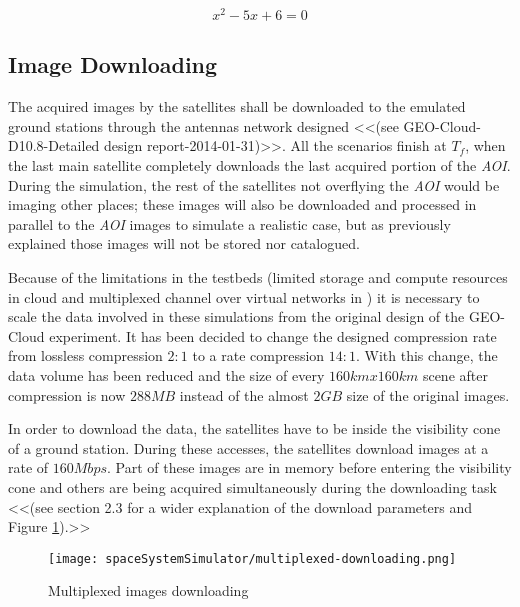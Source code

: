 \begin{equation} \label{eq:solve}
x^2 - 5 x + 6 = 0
\end{equation}



\subsection{Image Downloading}
\label{subsec:image-downloading}

The acquired images by the satellites shall be downloaded to the emulated ground
stations through the antennas network designed <<(see GEO-Cloud-D10.8-Detailed
design report-2014-01-31)>>. All the scenarios finish at $T_f$, when the last
main satellite completely downloads the last acquired portion of the
\emph{AOI}. During the simulation, the rest of the satellites not overflying the
\emph{AOI} would be imaging other places; these images will also be downloaded
and processed in parallel to the \emph{AOI} images to simulate a realistic case,
but as previously explained those images will not be stored nor catalogued.

Because of the limitations in the testbeds (limited storage and compute
resources in \bonfire cloud and multiplexed channel over virtual networks in
\vw) it is necessary to scale the data involved in these simulations from the
original design of the GEO-Cloud experiment. It has been decided to change the
designed compression rate from lossless compression $2:1$ to a rate compression
$14:1$. With this change, the data volume has been reduced and the size of every
$160km x 160km$ scene after compression is now $288MB$ instead of the almost
$2GB$ size of the original images.

In order to download the data, the satellites have to be inside the visibility cone of a ground station. During these accesses, the satellites download images at a rate of $160Mbps$. Part of these images are in memory before entering the visibility cone and others are being acquired simultaneously during the downloading task <<(see section 2.3 for a wider explanation of the download parameters and Figure \ref{fig:sss-multiplexed-downloading}).>>

\begin{figure}[!h]
\begin{center}
\texttt{[image: spaceSystemSimulator/multiplexed-downloading.png]}
\caption{Multiplexed images downloading}
\label{fig:sss-multiplexed-downloading}
\end{center}
\end{figure}



